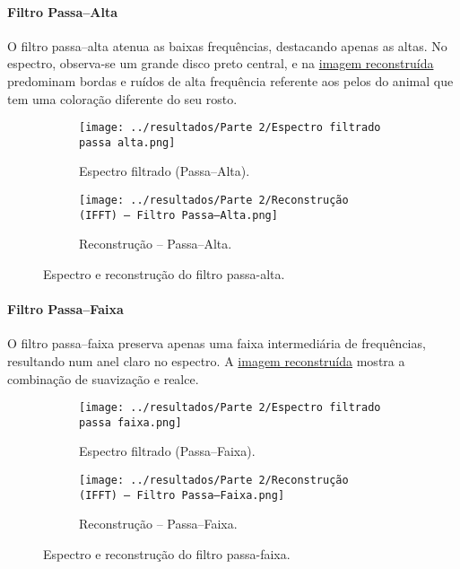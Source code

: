 \documentclass[12pt,a4paper]{article}
\begin{document}
\paragraph{Filtro Passa–Alta}
O filtro passa–alta atenua as baixas frequências, destacando apenas as altas. No espectro, observa-se um grande disco preto central, e na \href{fig:rec_pa}{imagem reconstruída} predominam bordas e ruídos de alta frequência referente aos pelos do animal que tem uma coloração diferente do seu rosto.

\begin{figure}[H]
  \centering
  \begin{subfigure}[b]{0.45\linewidth}
    \centering
    \texttt{[image: ../resultados/Parte 2/Espectro filtrado passa alta.png]}
    \caption{Espectro filtrado (Passa–Alta).}
    \label{fig:espec_pa}
  \end{subfigure}
  \hfill
  \begin{subfigure}[b]{0.45\linewidth}
    \centering
    \texttt{[image: ../resultados/Parte 2/Reconstrução (IFFT) — Filtro Passa–Alta.png]}
    \caption{Reconstrução – Passa–Alta.}
    \label{fig:rec_pa}
  \end{subfigure}
  \caption{Espectro e reconstrução do filtro passa-alta.}
  \label{fig:pa_comparacao}
\end{figure}


\paragraph{Filtro Passa–Faixa}
O filtro passa–faixa preserva apenas uma faixa intermediária de frequências, resultando num anel claro no espectro. A \href{fig:rec_pf}{imagem reconstruída} mostra a combinação de suavização e realce.

\begin{figure}[H]
  \centering
  \begin{subfigure}[b]{0.45\linewidth}
    \centering
    \texttt{[image: ../resultados/Parte 2/Espectro filtrado passa faixa.png]}
    \caption{Espectro filtrado (Passa–Faixa).}
    \label{fig:espec_pf}
  \end{subfigure}
  \hfill
  \begin{subfigure}[b]{0.45\linewidth}
    \centering
    \texttt{[image: ../resultados/Parte 2/Reconstrução (IFFT) — Filtro Passa–Faixa.png]}
    \caption{Reconstrução – Passa–Faixa.}
    \label{fig:rec_pf}
  \end{subfigure}
  \caption{Espectro e reconstrução do filtro passa-faixa.}
  \label{fig:pf_comparacao}
\end{figure}
\end{document}
